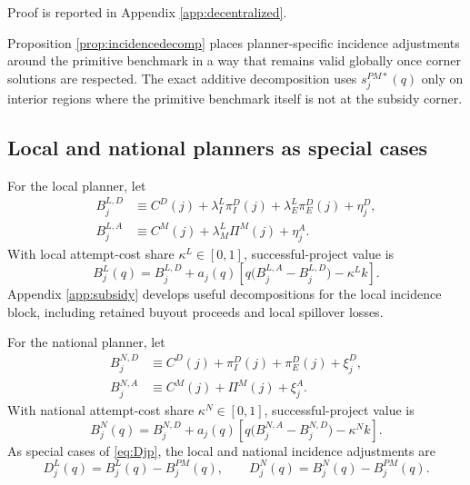 Proof is reported in Appendix \ref{app:decentralized}.

Proposition \ref{prop:incidencedecomp} places planner-specific incidence adjustments around the primitive benchmark in a way that remains valid globally once corner solutions are respected. The exact additive decomposition uses $s_j^{PM*}(q)$ only on interior regions where the primitive benchmark itself is not at the subsidy corner.

\subsection{Local and national planners as special cases}

For the local planner, let
\begin{align}
    B_j^{L,D}
    &\equiv
    C^D(j)
    + \lambda_I^L \pi_I^D(j)
    + \lambda_E^L \pi_E^D(j)
    + \eta_j^D, \label{eq:BLD} \\
    B_j^{L,A}
    &\equiv
    C^M(j)
    + \lambda_M^L \Pi^M(j)
    + \eta_j^A. \label{eq:BLA}
\end{align}
With local attempt-cost share $\kappa^L\in[0,1]$, successful-project value is
\begin{equation}\label{eq:BLq}
    B_j^L(q)
    =
    B_j^{L,D}
    +
    a_j(q)
    \left[
        q\bigl(B_j^{L,A}-B_j^{L,D}\bigr)-\kappa^L k
    \right].
\end{equation}
Appendix \ref{app:subsidy} develops useful decompositions for the local incidence block, including retained buyout proceeds and local spillover losses.

For the national planner, let
\begin{align}
    B_j^{N,D}
    &\equiv
    C^D(j)+\pi_I^D(j)+\pi_E^D(j)+\xi_j^D, \label{eq:BND} \\
    B_j^{N,A}
    &\equiv
    C^M(j)+\Pi^M(j)+\xi_j^A. \label{eq:BNA}
\end{align}
With national attempt-cost share $\kappa^N\in[0,1]$, successful-project value is
\begin{equation}\label{eq:BNq}
    B_j^N(q)
    =
    B_j^{N,D}
    +
    a_j(q)
    \left[
        q\bigl(B_j^{N,A}-B_j^{N,D}\bigr)-\kappa^N k
    \right].
\end{equation}
As special cases of \eqref{eq:Djp}, the local and national incidence adjustments are
\begin{equation}
    D_j^L(q)=B_j^L(q)-B_j^{PM}(q),
    \qquad
    D_j^N(q)=B_j^N(q)-B_j^{PM}(q).
\end{equation}

